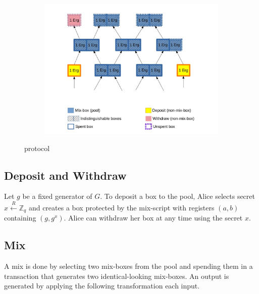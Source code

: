 \documentclass[runningheads]{llncs}
\newcommand{\rand}{\stackrel{R}{\leftarrow}}
\begin{document}
\begin{figure}[h]
	\centering
	\begin{subfigure}{.8\textwidth}
		\centering
		\includegraphics[width=\linewidth]{Sigmajoin.jpg}
	\end{subfigure}%
	\caption{\algname protocol}
	\label{fig:sigmajoin}
\end{figure}

\subsection{Deposit and Withdraw}

Let $g$ be a fixed generator of $G$. To deposit a box to the pool, Alice selects secret $x\rand \mathbb{Z}_q$ and creates a box protected by the mix-script with registers $(a, b)$ containing $(g, g^x)$. Alice can withdraw her box at any time using the secret $x$.

\subsection{Mix}
\label{mix}

A mix is done by selecting two mix-boxes from the pool and spending them in a transaction that generates two identical-looking mix-boxes. An output is generated by applying the following transformation each input. 
\end{document}
